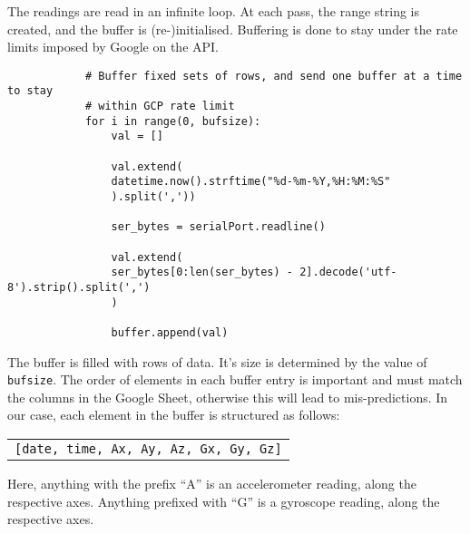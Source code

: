 \documentclass[./main.tex]{subfiles}
\begin{document}
The readings are read in an infinite loop. At each pass, the range string is
created, and the buffer is (re-)initialised. Buffering is done to stay under
the rate limits imposed by Google on the API.

\begin{code}
    \begin{verbatim}
            # Buffer fixed sets of rows, and send one buffer at a time to stay
            # within GCP rate limit
            for i in range(0, bufsize):
                val = []

                val.extend(
                datetime.now().strftime("%d-%m-%Y,%H:%M:%S"
                ).split(','))

                ser_bytes = serialPort.readline()

                val.extend(
                ser_bytes[0:len(ser_bytes) - 2].decode('utf-8').strip().split(',')
                )

                buffer.append(val)
    \end{verbatim}
    \caption{Populate the buffer}
    \label{code:popbuf}
\end{code}
\vspace{0.5cm}

The buffer is filled with rows of data. It's size is determined by the value of
\texttt{bufsize}. The order of elements in each buffer entry is important and
must match the columns in the Google Sheet, otherwise this will lead to
mis-predictions. In our case, each element in the buffer is structured as
follows:
\begin{code}
    \begin{table}[H]
        \centering
        \begin{tabular}{c}
            \texttt{[date, time, Ax, Ay, Az, Gx, Gy, Gz]}
        \end{tabular}
    \end{table}
    \caption{Value list format}
    \label{code:vallist}
\end{code}
\vspace{0.5cm}

Here, anything with the prefix ``A'' is an accelerometer reading, along the
respective axes. Anything prefixed with ``G'' is a gyroscope reading, along the
respective axes.
\end{document}
